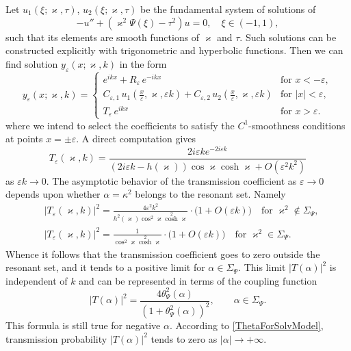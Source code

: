 \documentclass[11pt,english]{amsart}
\begin{document}
Let $u_1(\xi;\varkappa,\tau)$, $u_2(\xi;\varkappa,\tau)$ be the fundamental system of solutions of
$$
-u''+(\varkappa^2\Psi(\xi)-\tau^2)u= 0, \quad \xi\in(-1,1),
$$
such that its elements are smooth functions of $\varkappa$ and $\tau$.
Such solutions can be constructed explicitly with trigonometric and  hyperbolic functions.
Then we can find  solution  $y_\varepsilon(x;\varkappa,k)$ in the form
\begin{equation*}
y_\varepsilon(x;\varkappa,k)=
\begin{cases}
e^{ikx}+R_\varepsilon\,e^{-ikx}& \text{for } x<-\varepsilon,\\
C_{\varepsilon,1}\,u_1(\frac{x}{\varepsilon},\varkappa, \varepsilon k)+C_{\varepsilon,2}\,u_2(\frac{x}{\varepsilon},\varkappa, \varepsilon k) & \text{for } |x|<\varepsilon,\\
T_\varepsilon\,e^{ikx} & \text{for } x>\varepsilon.
\end{cases}
\end{equation*}
where we intend to select the coefficients to satisfy  the $C^1$-smoothness conditions at points $x=\pm \varepsilon$.
A direct computation gives
\begin{equation}\label{Teps}
  T_\varepsilon(\varkappa,k)= \frac{2i\varepsilon k e^{-2i\varepsilon k}}{(2i\varepsilon k-h(\varkappa))\cos\varkappa \operatorname*{cosh}\varkappa+O(\varepsilon^2k^2)}
\end{equation}
as $\varepsilon k\to 0$. The asymptotic behavior of the transmission coefficient as $\varepsilon\to 0$ depends upon whether $\alpha=\kappa^2$ belongs to the resonant set. Namely
\begin{align}\label{TepsAsymptotics}
  &|T_\varepsilon(\varkappa,k)|^2= \frac{4\varepsilon^2 k^2}{h^2(\varkappa)\cos^2\varkappa \operatorname*{cosh}^2\varkappa}\cdot
  \bigl(1+O\left(\varepsilon k\right)\bigr)\quad\text{for }
  \varkappa^2\not\in \Sigma_\Psi,\\\label{TepsAsymptoticsR}
  &|T_\varepsilon(\varkappa,k)|^2= \frac{1}{\cos^2\varkappa \operatorname*{cosh}^2\varkappa}\cdot\bigl(1+O(\varepsilon k)\bigr)\quad\text{for }
  \varkappa^2\in \Sigma_\Psi.
\end{align}
Whence it follows that the transmission coefficient goes to zero outside  the resonant set, and
it tends to a positive limit for $\alpha\in \Sigma_{\Psi}$. This limit $|T(\alpha)|^2$ is independent of $k$
and can be represented  in terms of the coupling function
\begin{equation*}
  |T(\alpha)|^2=\frac{4\theta_\Psi^2(\alpha)}{(1+\theta_\Psi^2(\alpha))^2}, \qquad \alpha\in \Sigma_\Psi.
\end{equation*}
This formula is still true  for negative $\alpha$. According to \eqref{ThetaForSolvModel},  transmission probability $|T(\alpha)|^2$ tends to zero as $|\alpha|\to +\infty$.
\end{document}
